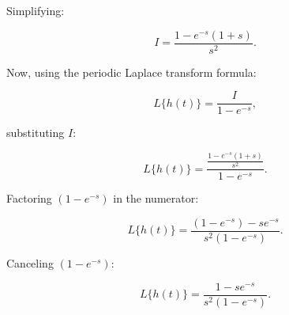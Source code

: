 \documentclass[12pt]{article}
\begin{document}
\begin{enumerate}
Simplifying:

\[
I = \frac{1 - e^{-s}(1 + s)}{s^2}.
\]

Now, using the periodic Laplace transform formula:

\[
L\{ h(t) \} = \frac{I}{1 - e^{-s}},
\]

substituting \( I \):

\[
L\{ h(t) \} = \frac{\frac{1 - e^{-s} (1 + s)}{s^2}}{1 - e^{-s}}.
\]

Factoring \( (1 - e^{-s}) \) in the numerator:

\[
L\{ h(t) \} = \frac{(1 - e^{-s}) - s e^{-s}}{s^2 (1 - e^{-s})}.
\]

Canceling \( (1 - e^{-s}) \):

\[
L\{ h(t) \} = \frac{1 - s e^{-s}}{s^2 (1 - e^{-s})}.
\]

\end{enumerate}
\end{document}
